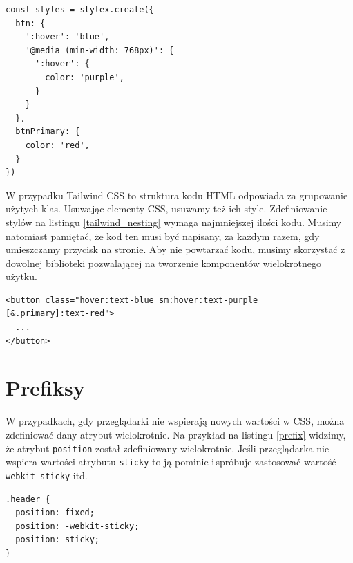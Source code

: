 \documentclass[a4paper,12pt]{book} %
\begin{document}
\begin{lstfloat}[hb]
  \lstset{language=HTML}
  \begin{lstlisting}[frame=single]
const styles = stylex.create({
  btn: {
    ':hover': 'blue',
    '@media (min-width: 768px)': {
      ':hover': {
        color: 'purple',
      }
    }
  },
  btnPrimary: {
    color: 'red',
  }
})
\end{lstlisting}
  \caption{Zagnieżdżanie się reguł w StyleX}\label{stylex_nesting}
\end{lstfloat}

W przypadku Tailwind CSS to struktura kodu HTML odpowiada za grupowanie użytych klas. Usuwając elementy CSS, usuwamy też ich style. Zdefiniowanie stylów na listingu \ref{tailwind_nesting} wymaga najmniejszej ilości kodu. Musimy natomiast pamiętać, że kod ten musi być napisany, za każdym razem, gdy umieszczamy przycisk na stronie. Aby nie powtarzać kodu, musimy skorzystać z dowolnej biblioteki pozwalającej na tworzenie komponentów wielokrotnego użytku.




\begin{lstfloat}[hb]
  \lstset{language=HTML}
  \begin{lstlisting}[frame=single]
<button class="hover:text-blue sm:hover:text-purple
[&.primary]:text-red">
  ...
</button>
\end{lstlisting}
  \caption{Grupowanie reguł w Tailwind CSS}\label{tailwind_nesting}
\end{lstfloat}

\clearpage 
\section{Prefiksy}
W przypadkach, gdy przeglądarki nie wspierają nowych wartości w CSS, można zdefiniować dany atrybut wielokrotnie. Na przykład na listingu \ref{prefix} widzimy, że atrybut \lstinline|position| został zdefiniowany wielokrotnie. Jeśli przeglądarka nie wspiera wartości atrybutu \lstinline|sticky| to ją pominie i\,spróbuje zastosować wartość \lstinline|-webkit-sticky| itd.

\begin{lstfloat}[hb]
  \lstset{language=HTML}
  \begin{lstlisting}[frame=single]
.header {
  position: fixed;
  position: -webkit-sticky;
  position: sticky;
}
\end{lstlisting}
  \caption{Prefiksy w CSS}\label{prefix}
\end{lstfloat}
\end{document}
